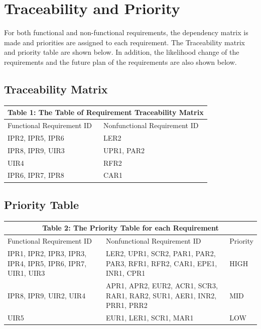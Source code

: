 \documentclass[12pt]{article}
\begin{document}
\section{Traceability and Priority}
For both functional and non-functional requirements, the dependency matrix is made and priorities are assigned to each requirement. The Traceability matrix and priority table are shown below. In addition, the likelihood change of the requirements and the future plan of the requirements are also shown below.

\subsection{Traceability Matrix}
\begin{tabular}{|p{}| p{}|}
\hline \multicolumn{2}{|c|}{Table 1: The Table of Requirement Traceability Matrix}\\

\hline Functional Requirement ID & Nonfunctional Requirement ID\\

\hline IPR2, IPR5, IPR6 & LER2\\

\hline IPR8, IPR9, UIR3 & UPR1, PAR2\\
\hline UIR4 & RFR2\\
\hline IPR6, IPR7, IPR8 & CAR1\\
\hline

\end{tabular}

\subsection{Priority Table}
\begin{tabular}{|p{}|p{}|p{}|}

\hline \multicolumn{3}{|c|}{Table 2: The Priority Table for each Requirement}\\

\hline Functional Requirement ID&Nonfunctional Requirement ID&Priority\\

\hline IPR1, IPR2, IPR3, IPR3, IPR4, IPR5, IPR6, IPR7, UIR1, UIR3 & LER2, UPR1, SCR2, PAR1, PAR2, PAR3, RFR1, RFR2, CAR1, EPE1, INR1, CPR1 & HIGH\\

\hline IPR8, IPR9, UIR2, UIR4 & APR1, APR2, EUR2, ACR1, SCR3, RAR1, RAR2, SUR1, AER1, INR2, PRR1, PRR2 & MID\\

\hline UIR5 & EUR1, LER1, SCR1, MAR1 & LOW\\

\hline

\end{tabular}
\end{document}

